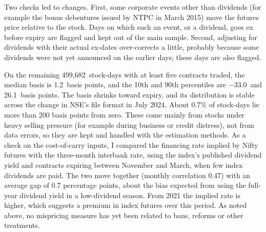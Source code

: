 \documentclass[11pt,a4paper]{article}
\newcommand{\basisN}{499{,}682}
\newcommand{\basisMedian}{1.2}
\newcommand{\basisPten}{$-33.0$}
\newcommand{\basisPninety}{26.1}
\begin{document}
Two checks led to changes. First, some corporate events other than dividends (for example the bonus debentures issued by NTPC
in March 2015) move the futures price relative to the stock. Days on which such an event, or a dividend, goes ex before expiry
are flagged and kept out of the main sample. Second, adjusting for dividends with their actual ex-dates over-corrects a little,
probably because some dividends were not yet announced on the earlier days; these days are also flagged.

On the remaining \basisN\ stock-days with at least five contracts traded, the median basis is \basisMedian\ basis points, and
the 10th and 90th percentiles are \basisPten\ and \basisPninety\ basis points. The basis shrinks toward expiry, and its
distribution is stable across the change in NSE's file format in July 2024. About 0.7\% of stock-days lie more than 200 basis
points from zero. These come mainly from stocks under heavy selling pressure (for example during business or credit distress),
not from data errors, so they are kept and handled with the estimation methods. As a check on the cost-of-carry inputs, I compared the financing rate implied by Nifty futures with the three-month
interbank rate, using the index's published dividend yield and contracts expiring between November and March, when few
index dividends are paid. The two move together (monthly correlation 0.47) with an average gap of 0.7 percentage points,
about the bias expected from using the full-year dividend yield in a low-dividend season. From 2021 the implied rate is
higher, which suggests a premium in index futures over this period. As noted above, no mispricing measure has yet been related to bans,
reforms or other treatments.
\end{document}
